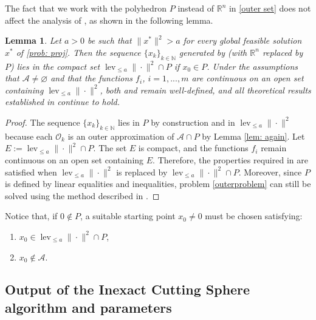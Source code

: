 \documentclass[12pt]{amsart}
\theoremstyle{plain}
\newtheorem{lemma}[theorem]{Lemma}
\theoremstyle{definition}
\begin{document}
The fact that we work with the polyhedron \(P\) instead of \(\mathbb{R}^n\) in \eqref{outer set} does not affect the analysis of \cite[Algorithm 1 and 3]{bednarczuk2026outer}, as shown in the following lemma.

\begin{lemma}
Let \(a > 0\) be such that \(\|x^*\|^2 > a\) for every global feasible solution \(x^*\) of \eqref{prob: proj}. Then the sequence \(\{x_k\}_{k \in \mathbb{N}}\) generated by \cite[Algorithm 1]{bednarczuk2026outer} (with \(\mathbb{R}^n\) replaced by \(P\)) lies in the compact set \(\operatorname{lev}_{\le a} \|\cdot\|^2 \cap P\) if $x_0\in P$. Under the assumptions that \(\mathcal{A} \neq \varnothing\) and that the functions \(f_i\), \(i=1,...,m\) are continuous on an open set containing \(\operatorname{lev}_{\le a} \|\cdot\|^2\), both \cite[Algorithm 1]{bednarczuk2026outer} and \cite[Algorithm 3]{bednarczuk2026outer} remain well-defined, and all theoretical results established in \cite{bednarczuk2026outer} continue to hold.
\end{lemma}

\begin{proof}
The sequence \(\{x_k\}_{k \in \mathbb{N}}\) lies in \(P\) by construction and in \(\operatorname{lev}_{\le a} \|\cdot\|^2\) because each \(\mathcal{O}_k\) is an outer approximation of \(\mathcal{A}\cap P\) by Lemma \ref{lem: again}. Let \(E := \operatorname{lev}_{\le a} \|\cdot\|^2 \cap P\). The set \(E\) is compact, and the functions \(f_i\) remain continuous on an open set containing \(E\). Therefore, the properties required in \cite[Assumption 1]{bednarczuk2026outer} are satisfied when \(\operatorname{lev}_{\le a} \|\cdot\|^2\) is replaced by \(\operatorname{lev}_{\le a} \|\cdot\|^2 \cap P\). Moreover, since \(P\) is defined by linear equalities and inequalities, problem \eqref{outerproblem} can still be solved using the method described in \cite[Subsection 8.2]{bednarczuk2026outer}.
\end{proof}

Notice that, if \(0 \notin P\), a suitable starting point \(x_0 \neq 0\) must be chosen satisfying:
\begin{enumerate}
    \item \(x_0 \in \operatorname{lev}_{\le a} \|\cdot\|^2 \cap P\),
    \item \(x_0 \notin \mathcal{A}\).
\end{enumerate}

\subsection{Output of the Inexact Cutting Sphere algorithm and parameters}
\end{document}

